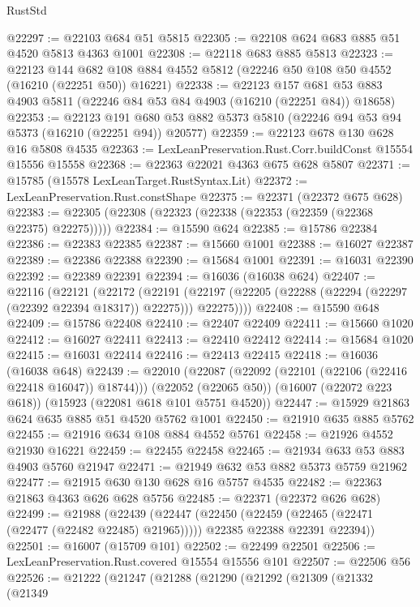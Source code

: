 \begin{lexlean}{RustStd}
\begin{coremodule}
@22297 := @22103 @684 @51 @5815
@22305 := @22108 @624 @683 @885 @51 @4520 @5813 @4363 @1001
@22308 := @22118 @683 @885 @5813
@22323 := @22123
    @144
    @682
    @108
    @884
    @4552
    @5812
    (@22246 @50 @108 @50 @4552 (@16210 (@22251 @50)) @16221)
@22338 := @22123
    @157
    @681
    @53
    @883
    @4903
    @5811
    (@22246 @84 @53 @84 @4903 (@16210 (@22251 @84)) @18658)
@22353 := @22123
    @191
    @680
    @53
    @882
    @5373
    @5810
    (@22246 @94 @53 @94 @5373 (@16210 (@22251 @94)) @20577)
@22359 := @22123 @678 @130 @628 @16 @5808 @4535
@22363 := LexLeanPreservation.Rust.Corr.buildConst @15554 @15556 @15558
@22368 := @22363 @22021 @4363 @675 @628 @5807
@22371 := @15785 (@15578 LexLeanTarget.RustSyntax.Lit)
@22372 := LexLeanPreservation.Rust.constShape
@22375 := @22371 (@22372 @675 @628)
@22383 := @22305 (@22308 (@22323 (@22338 (@22353 (@22359 (@22368 @22375) @22275)))))
@22384 := @15590 @624
@22385 := @15786 @22384
@22386 := @22383 @22385
@22387 := @15660 @1001
@22388 := @16027 @22387
@22389 := @22386 @22388
@22390 := @15684 @1001
@22391 := @16031 @22390
@22392 := @22389 @22391
@22394 := @16036 (@16038 @624)
@22407 := @22116
    (@22121
      (@22172
        (@22191 (@22197 (@22205 (@22288 (@22294 (@22297 (@22392 @22394 @18317)) @22275))) @22275))))
@22408 := @15590 @648
@22409 := @15786 @22408
@22410 := @22407 @22409
@22411 := @15660 @1020
@22412 := @16027 @22411
@22413 := @22410 @22412
@22414 := @15684 @1020
@22415 := @16031 @22414
@22416 := @22413 @22415
@22418 := @16036 (@16038 @648)
@22439 := @22010
    (@22087 (@22092 (@22101 (@22106 (@22416 @22418 @16047)) @18744)))
    (@22052 (@22065 @50))
    (@16007 (@22072 @223 @618))
    (@15923 (@22081 @618 @101 @5751 @4520))
@22447 := @15929 @21863 @624 @635 @885 @51 @4520 @5762 @1001
@22450 := @21910 @635 @885 @5762
@22455 := @21916 @634 @108 @884 @4552 @5761
@22458 := @21926 @4552 @21930 @16221
@22459 := @22455 @22458
@22465 := @21934 @633 @53 @883 @4903 @5760 @21947
@22471 := @21949 @632 @53 @882 @5373 @5759 @21962
@22477 := @21915 @630 @130 @628 @16 @5757 @4535
@22482 := @22363 @21863 @4363 @626 @628 @5756
@22485 := @22371 (@22372 @626 @628)
@22499 := @21988
    (@22439
      (@22447
        (@22450 (@22459 (@22465 (@22471 (@22477 (@22482 @22485) @21965)))))
        @22385
        @22388
        @22391
        @22394))
@22501 := @16007 (@15709 @101)
@22502 := @22499 @22501
@22506 := LexLeanPreservation.Rust.covered @15554 @15556 @101
@22507 := @22506 @56
@22526 := @21222
    (@21247
      (@21288
        (@21290
          (@21292
            (@21309
              (@21332
                (@21349

\end{coremodule}
\end{lexlean}
